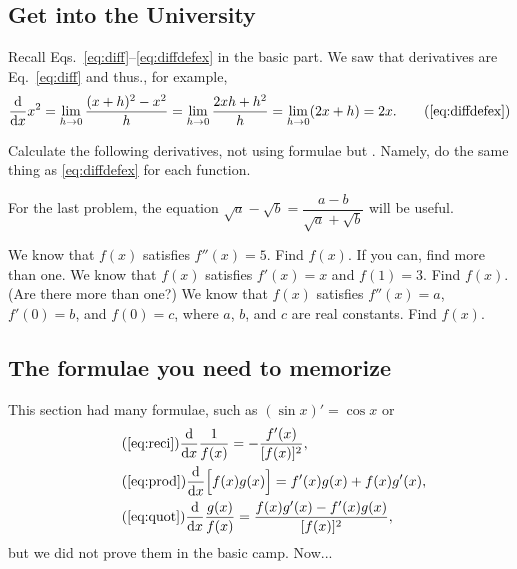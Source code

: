 \documentclass[11pt,pdfa,lastpage]{MishoNote}
\begin{document}
\subsection{Get into the University}
Recall Eqs.~\eqref{eq:diff}--\eqref{eq:diffdefex} in the basic part. We saw that derivatives are  Eq.~\eqref{eq:diff} and thus., for example,
\begin{equation}
  \diff{}{x}x^2=\lim_{h\to 0}\frac{(x+h)^2-x^2}{h}=\lim_{h\to 0}\frac{2xh+h^2}{h}=\lim_{h\to 0}(2x+h)=2x.
  \tag{\ref{eq:diffdefex}}
\end{equation}
\medskip
\begin{enumerate}[resume]
  \itemC Calculate the following derivatives, not using formulae but . Namely, do the same thing as \eqref{eq:diffdefex} for each function.
  \medskip
  \begin{menumerate}{3}
  \end{menumerate}
  For the last problem, the equation $\displaystyle\sqrt{a}-\sqrt{b}=\dfrac{a-b}{\sqrt{a}+\sqrt{b}}$ will be useful.

  \itemA We know that $f(x)$ satisfies $f''(x)=5$. Find $f(x)$. If you can, find more than one.
  \itemB We know that $f(x)$ satisfies $f'(x)=x$ and $f(1)=3$. Find $f(x)$. (Are there more than one?)
  \itemC We know that $f(x)$ satisfies $f''(x)=a$, $f'(0)=b$, and $f(0)=c$, where $a$, $b$, and $c$ are real constants. Find $f(x)$.
\end{enumerate}

\subsection{The formulae you need to memorize}
This section had many formulae, such as $(\sin x)'=\cos x$ or
\begin{align}
  &\tag{\ref{eq:reci}} \diff{}{x}\frac{1}{f(x)}=-\frac{f'(x)}{[f(x)]^2},\\
   &\tag{\ref{eq:prod}} \diff{}{x}\Bigl[f(x)g(x)\Bigr]=f'(x)g(x)+f(x)g'(x),\\
   &\tag{\ref{eq:quot}} \diff{}{x}\frac{g(x)}{f(x)}=\frac{f(x)g'(x)-f'(x)g(x)}{[f(x)]^2},
 \end{align}
 but we did not prove them in the basic camp. Now...
\end{document}
